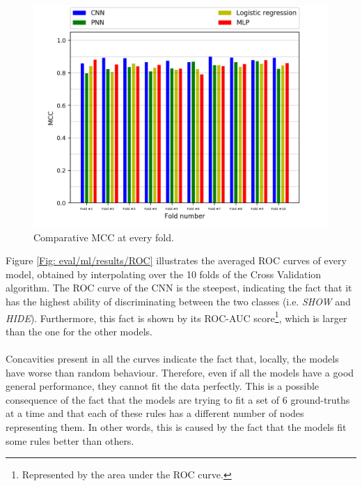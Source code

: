 		\begin{figure}[H]
			\centering
			\includegraphics[width=\textwidth]{graphics/MCC-per-fold}
			\caption{Comparative MCC at every fold.}
			\label{Fig: eval/ml/results/MCC-per-fold}
		\end{figure}
		Figure \ref{Fig: eval/ml/results/ROC} illustrates the averaged ROC curves of every model, obtained by interpolating over the 10 folds of the Cross Validation algorithm. The ROC curve of the CNN is the steepest, indicating the fact that it has the highest ability of discriminating between the two classes (i.e. \textit{SHOW} and \textit{HIDE}). Furthermore, this fact is shown by its ROC-AUC score\footnote{Represented by the area under the ROC curve.}, which is larger than the one for the other models.
		\\ \\
		Concavities present in all the curves indicate the fact that, locally, the models have worse than random behaviour. Therefore, even if all the models have a good general performance, they cannot fit the data perfectly. This is a possible consequence of the fact that the models are trying to fit a set of $6$ ground-truths at a time and that each of these rules has a different number of nodes representing them. In other words, this is caused by the fact that the models fit some rules better than others. 
